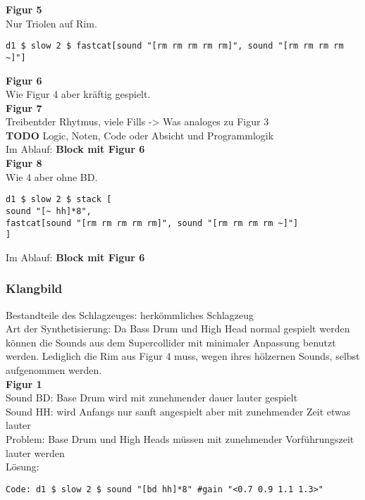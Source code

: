 \documentclass[
10pt, %
a4paper, %
oneside, %
headinclude,footinclude, %
BCOR5mm, %
]{scrartcl}
\begin{document}
\noindent \textbf{Figur 5}\\
Nur Triolen auf Rim.
\begin{lstlisting}
d1 $ slow 2 $ fastcat[sound "[rm rm rm rm rm]", sound "[rm rm rm rm ~]"]
\end{lstlisting}


\noindent \textbf{Figur 6}\\
Wie Figur 4 aber kräftig gespielt.\\

\noindent \textbf{Figur 7}\\
Treibentder Rhytmus, viele Fills -> Was analoges zu Figur 3\\
{\color{red}\textbf{TODO}} Logic, Noten, Code oder Absicht und Programmlogik\\

\noindent Im Ablauf: \textbf{Block mit Figur 6}\\

\noindent \textbf{Figur 8}\\
Wie 4 aber ohne BD.
\begin{lstlisting}
d1 $ slow 2 $ stack [
sound "[~ hh]*8",
fastcat[sound "[rm rm rm rm rm]", sound "[rm rm rm rm ~]"]
]
\end{lstlisting}

\noindent Im Ablauf: \textbf{Block mit Figur 6}

\subsubsection{Klangbild}
Bestandteile des Schlagzeuges: herkömmliches Schlagzeug\\
Art der Synthetisierung: Da Bass Drum und High Head normal gespielt werden können die Sounds aus dem Supercollider 
mit minimaler Anpassung benutzt werden. Lediglich die Rim aus Figur 4 muss, wegen ihres hölzernen Sounds, selbst 
aufgenommen werden.\\
\noindent \textbf{Figur 1}\\
Sound BD: Base Drum wird mit zunehmender dauer lauter gespielt\\
Sound HH: wird Anfangs nur sanft angespielt aber mit zunehmender Zeit etwas lauter\\
Problem: Base Drum und High Heads müssen mit zunehmender Vorführungszeit lauter werden\\ 
Lösung:\\
\begin{lstlisting}
Code: d1 $ slow 2 $ sound "[bd hh]*8" #gain "<0.7 0.9 1.1 1.3>"
\end{lstlisting}
\end{document}
